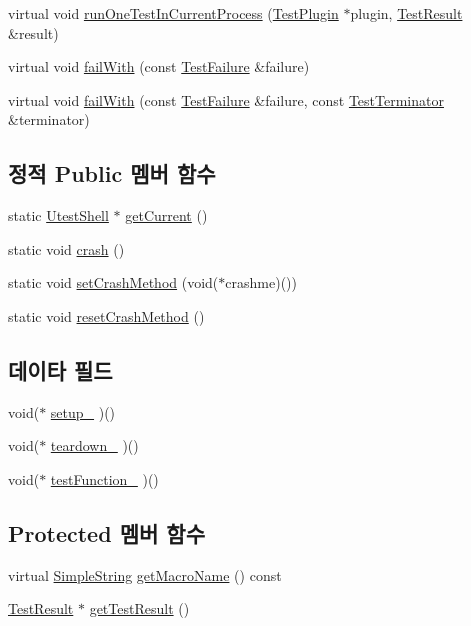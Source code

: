 \begin{DoxyCompactItemize}
\item 
virtual void \hyperlink{class_utest_shell_a468a088beac3c881bdaea58bc6acaecf}{run\+One\+Test\+In\+Current\+Process} (\hyperlink{class_test_plugin}{Test\+Plugin} $\ast$plugin, \hyperlink{class_test_result}{Test\+Result} \&result)
\item 
virtual void \hyperlink{class_utest_shell_ad50ae28f5ad9f1d224832cb1f89365a7}{fail\+With} (const \hyperlink{class_test_failure}{Test\+Failure} \&failure)
\item 
virtual void \hyperlink{class_utest_shell_a5deb4c5d28a360e44345deea323d5db7}{fail\+With} (const \hyperlink{class_test_failure}{Test\+Failure} \&failure, const \hyperlink{class_test_terminator}{Test\+Terminator} \&terminator)
\end{DoxyCompactItemize}
\subsection*{정적 Public 멤버 함수}
\begin{DoxyCompactItemize}
\item 
static \hyperlink{class_utest_shell}{Utest\+Shell} $\ast$ \hyperlink{class_utest_shell_afeb97f1f06324a42444c71b412655122}{get\+Current} ()
\item 
static void \hyperlink{class_utest_shell_a4cd75601b53e872ab7a3b642fc825af3}{crash} ()
\item 
static void \hyperlink{class_utest_shell_a1b50094a723618e90533fe315e1e3101}{set\+Crash\+Method} (void($\ast$crashme)())
\item 
static void \hyperlink{class_utest_shell_a85913b4e2d993573f82518a10ec19cde}{reset\+Crash\+Method} ()
\end{DoxyCompactItemize}
\subsection*{데이타 필드}
\begin{DoxyCompactItemize}
\item 
void($\ast$ \hyperlink{class_exec_function_test_shell_a3ad99c05e46ab50207dc271667f92ae2}{setup\+\_\+} )()
\item 
void($\ast$ \hyperlink{class_exec_function_test_shell_a51e477770ddd81e11c488a3301db1272}{teardown\+\_\+} )()
\item 
void($\ast$ \hyperlink{class_exec_function_test_shell_a8bd9b345a776ac6a0095aff4f4e31d03}{test\+Function\+\_\+} )()
\end{DoxyCompactItemize}
\subsection*{Protected 멤버 함수}
\begin{DoxyCompactItemize}
\item 
virtual \hyperlink{class_simple_string}{Simple\+String} \hyperlink{class_utest_shell_abc98797be12f56d8e67d44e2328f885f}{get\+Macro\+Name} () const 
\item 
\hyperlink{class_test_result}{Test\+Result} $\ast$ \hyperlink{class_utest_shell_a34c525b685e30431750d9e355fdfff0c}{get\+Test\+Result} ()
\end{DoxyCompactItemize}


